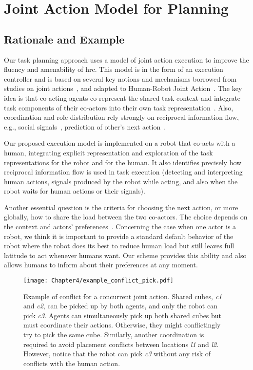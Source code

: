 \section{Joint Action Model for Planning}

    \subsection{Rationale and Example}



Our task planning approach uses a model of joint action execution to improve the fluency and amenability of \acrshort{hrc}. 
This model is in the form of an execution controller and is based on several key notions and mechanisms borrowed from studies on joint actions~\cite{Sebanz_2016,kourtis2014attention}, and adapted to Human-Robot Joint Action~\cite{clodic-2017,curioni-2019}.
The key idea is that co-acting agents co-represent the shared task context and integrate task components of their co-actors into their own task representation~\cite{Schmitz-2017, Yamaguchi-19}. Also, coordination and role distribution rely strongly on reciprocal information flow, e.g., social signals~\cite{curioni-2019}, prediction of other's next action~\cite{luke-2018}.

Our proposed execution model is implemented on a robot that co-acts with a human, integrating explicit representation and exploration of the task representations for the robot and for the human. 
It also identifies precisely how reciprocal information flow is used in task execution (detecting and interpreting human actions, signals produced by the robot while acting, and also when the robot waits for human actions or their signals).

Another essential question is the criteria for choosing the next action, or more globally, how to share the load between the two co-actors. The choice depends on the context and actors' preferences~\cite{Gombolay-2015, Strachan-2020, Curioni-2022}. 
Concerning the case when one actor is a robot, we think it is important to provide a standard default behavior of the robot where the robot does its best to reduce human load but still leaves full latitude to act whenever humans want. 
Our scheme provides this ability and also allows humans to inform about their preferences at any moment.

\begin{figure}
    \center
    \texttt{[image: Chapter4/example\_conflict\_pick.pdf]}
    \caption{Example of conflict for a concurrent joint action. 
    Shared cubes, \emph{c1} and \emph{c2}, can be picked up by both agents, and only the robot can pick \emph{c3}. 
    Agents can simultaneously pick up both shared cubes but must coordinate their actions. Otherwise, they might conflictingly try to pick the same cube. 
    Similarly, another coordination is required to avoid placement conflicts between locations \emph{l1} and \emph{l2}.
    However, notice that the robot can pick \emph{c3} without any risk of conflicts with the human action.}
    \label{fig:conflict_pick}
\end{figure}

